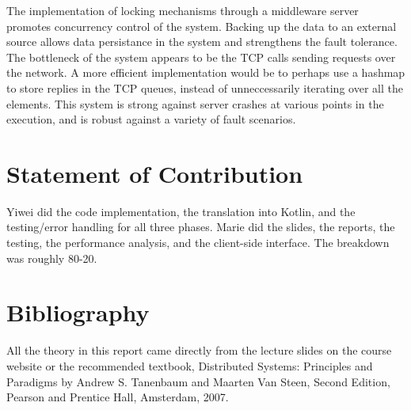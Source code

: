 \documentclass[letterpaper,12pt]{article}
\begin{document}
	The implementation of locking mechanisms through a middleware server promotes concurrency control of the system. Backing up the data to an external source allows data persistance in the system and strengthens the fault tolerance. The bottleneck of the system appears to be the TCP calls sending requests over the network. A more efficient implementation would be to perhaps use a hashmap to store replies in the TCP queues, instead of unneccessarily iterating over all the elements. This system is strong against server crashes at various points in the execution, and is robust against a variety of fault scenarios.
	
	\section{Statement of Contribution}
	Yiwei did the code implementation, the translation into Kotlin, and the testing/error handling for all three phases. Marie did the slides, the reports, the testing, the performance analysis, and the client-side interface. The breakdown was roughly 80-20. 
	
	\section{Bibliography}
	
	All the theory in this report came directly from the lecture slides on the course website or the recommended textbook, Distributed Systems: Principles and Paradigms by Andrew S. Tanenbaum and Maarten Van Steen, Second Edition, Pearson and Prentice Hall, Amsterdam, 2007. 
	
\end{document}
